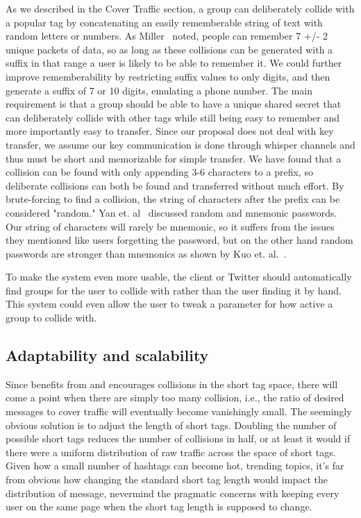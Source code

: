 As we described in the Cover Traffic section, a group can deliberately collide with a popular tag by concatenating an easily rememberable string of text with random letters or numbers. As Miller~\cite{miller56} noted, people can remember  
7 +/- 2 unique packets of data, so as long as these collisions can be generated with a suffix in that range a user is likely to be able to remember it. We could further improve rememberability by restricting suffix values to only digits, and then generate a suffix of 7 or 10 digits, emulating a phone number. The main requirement is that a group should be able to have a unique shared secret that can deliberately collide with other tags while still being easy to remember and more importantly easy to transfer. Since our proposal does not deal with key transfer, we assume our key communication is done through whisper channels and thus must be short and memorizable for simple transfer. We have found that a collision can be found with only appending 3-6 characters to a prefix, so deliberate collisions can both be found and transferred without much effort. By brute-forcing to find a collision, the string of characters after the prefix  can be considered "random." Yan et. al~\cite{yan00} discussed random and mnemonic passwords. Our string of characters will rarely be mnemonic, so it suffers from the issues they mentioned like users forgetting the password, but on the other hand random passwords are stronger than mnemonics as shown by Kuo et. al.~\cite{passwords06}.

To make the system even more usable, the client or Twitter should automatically find groups for the user to collide with rather than the user finding it by hand. This system could even allow the user to tweak a parameter for how active a group to collide with.
\fi



\subsection{Adaptability and scalability}

Since \hoot benefits from and encourages collisions in the short tag space, there will come a point when there are simply too many collision, i.e., the ratio of desired messages to cover traffic will eventually become vanishingly small. The seemingly obvious solution is to adjust the length of short tags. Doubling the number of possible short tags reduces the number of collisions in half, or at least it would if there were  a uniform distribution of raw traffic across the space of short tags. Given how a small number of hashtags can become hot, trending topics, it's far from obvious how changing the standard short tag length would impact the distribution of message, nevermind the pragmatic concerns with keeping every user on the same page when the short tag length is supposed to change.

